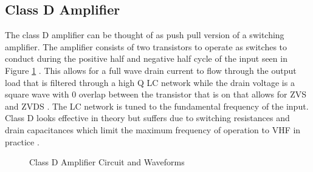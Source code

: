 \subsection{Class D Amplifier}

The class D amplifier can be thought of as push pull version of a switching amplifier. The amplifier consists of two transistors to operate as switches to conduct during the positive half and negative half cycle of the input seen in Figure \ref{fig:class_d} \cite{C.Cripps2006}. This allows for a full wave drain current to flow through the output load that is filtered through a high Q LC network while the drain voltage is a square wave with 0 overlap between the transistor that is on that allows for ZVS and ZVDS \cite{Rosu2001}. The LC network is tuned to the fundamental frequency of the input. Class D looks effective in theory but suffers due to switching resistances and drain capacitances which limit the maximum frequency of operation to VHF in practice \cite{Raab2003}.

\begin{figure}
    \caption{Class D Amplifier Circuit and Waveforms\cite{C.Cripps2006}}\label{fig:class_d}
\end{figure}


